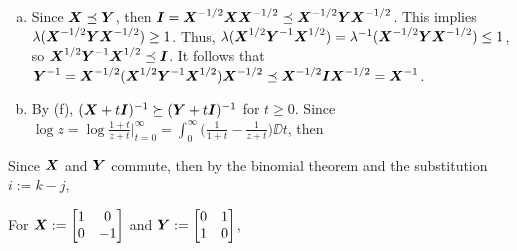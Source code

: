 \begin{answer}
\begin{enumerate}[(a)]
\item
Since $\boldsymbol{X}\preceq\boldsymbol{Y}$, then $\boldsymbol{I}=\boldsymbol{X}^{-1/2}\boldsymbol{X}\boldsymbol{X}^{-1/2}\preceq\boldsymbol{X}^{-1/2}\boldsymbol{Y}\boldsymbol{X}^{-1/2}$. This implies $\lambda(\boldsymbol{X}^{-1/2}\boldsymbol{Y}\boldsymbol{X}^{-1/2})\ge1$. Thus, $\lambda(\boldsymbol{X}^{1/2}\boldsymbol{Y}^{-1}\boldsymbol{X}^{1/2})=\lambda^{-1}(\boldsymbol{X}^{-1/2}\boldsymbol{Y}\boldsymbol{X}^{-1/2})\le1$, so $\boldsymbol{X}^{1/2}\boldsymbol{Y}^{-1}\boldsymbol{X}^{1/2}\preceq\boldsymbol{I}$. It follows that $\boldsymbol{Y}^{-1}=\boldsymbol{X}^{-1/2}(\boldsymbol{X}^{1/2}\boldsymbol{Y}^{-1}\boldsymbol{X}^{1/2})\boldsymbol{X}^{-1/2}\preceq\boldsymbol{X}^{-1/2}\boldsymbol{I}\boldsymbol{X}^{-1/2}=\boldsymbol{X}^{-1}$. 

\item
By (f), $(\boldsymbol{X}+t\boldsymbol{I})^{-1}\succeq(\boldsymbol{Y}+t\boldsymbol{I})^{-1}$ for $t\ge0$. Since $\log z=\log\frac{1+t}{z+t}\big|_{t=0}^\infty=\int_0^\infty\big(\frac1{1+t}-\frac1{z+t}\big)\DD t$, then
\end{enumerate}
\end{answer}

\begin{problem*}[Exercise 5.4.6]\label{ex5.4.6}

\end{problem*}
\begin{answer}
\item
Since $\boldsymbol{X}$ and $\boldsymbol{Y}$ commute, then by the binomial theorem and the substitution $i:=k-j$,

\item
For $\boldsymbol{X}:=\begin{bmatrix}1&0\\0&-1\end{bmatrix}$ and $\boldsymbol{Y}:=\begin{bmatrix}0&1\\1&0\end{bmatrix}$,
\end{answer}

